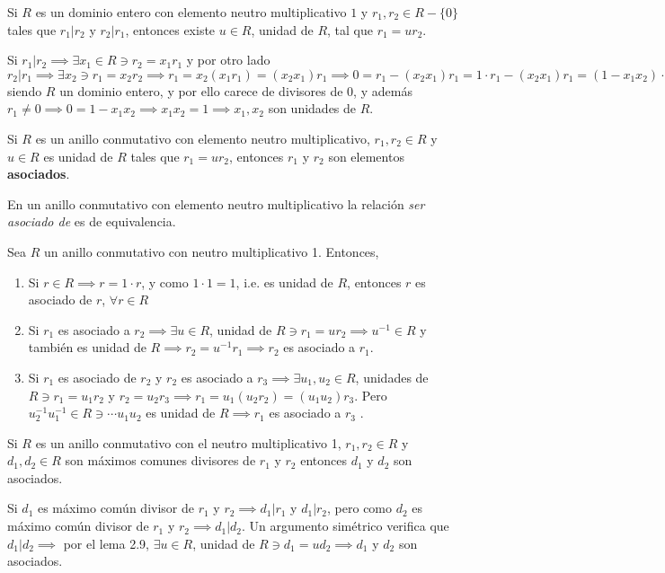 \begin{lema}[3.9]
    Si $R$ es un dominio entero con elemento neutro multiplicativo $1$ y $r_1,r_2\in R-\{0\}$ tales que $r_1|r_2$ y $r_2|r_1$, entonces existe $u\in R$, unidad de $R$, tal que $r_1=ur_2$.
    \begin{dem}
        Si $r_1|r_2\implies \exists x_1\in R\ni r_2=x_1r_1$ y por otro lado $r_2|r_1\implies \exists x_2\ni r_1=x_2r_2\implies r_1=x_2(x_1r_1)=(x_2x_1)r_1\implies 0=r_1-(x_2x_1)r_1 = 1\cdot r_1-(x_2x_1)r_1= (1-x_1x_2)\cdot r_1 \implies$ siendo $R$ un dominio entero, y por ello carece de divisores de 0, y además $r_1\neq 0\implies 0=1-x_1x_2\implies x_1x_2=1\implies x_1,x_2$ son unidades de $R$. 
    \end{dem} 
\end{lema}


\begin{definicion}
    Si $R$ es un anillo conmutativo con elemento neutro multiplicativo, $r_1,r_2\in R$ y $u\in R$ es unidad de $R$ tales que $r_1=ur_2$, entonces $r_1$ y $r_2$ son elementos \textbf{asociados}.
\end{definicion}

\begin{prop}
    En un anillo conmutativo con elemento neutro multiplicativo la relación \textit{ser asociado de} es de equivalencia. 
    \begin{dem}
        Sea $R$ un anillo conmutativo con neutro multiplicativo 1. Entonces, 
        \begin{enumerate}
            \item Si $r\in R\implies r=1\cdot r$, y como $1\cdot 1 =1$, i.e. es unidad de $R$, entonces $r$ es asociado de $r$, $\forall r\in R$
            \item Si $r_1$ es asociado a $r_2\implies\exists u\in R$, unidad de $R\ni r_1=ur_2\implies u^{-1}\in R$ y también es unidad de $R\implies r_2=u^{-1}r_1\implies r_2$ es asociado a $r_1$. 
            \item Si $r_1$ es asociado de $r_2$ y $r_2$ es asociado a $r_3\implies\exists u_1,u_2\in R$, unidades de $R\ni r_1=u_1r_2$ y $r_2=u_2r_3\implies r_1=u_1(u_2r_2)=(u_1u_2)r_3$. Pero $u_2^{-1}u_1^{-1}\in R\ni \cdots u_1u_2$ es unidad de $R\implies r_1$ es asociado a $r_3$ .  
        \end{enumerate}
    \end{dem}
\end{prop}

\begin{prop}
    Si $R$ es un anillo conmutativo con el neutro multiplicativo 1, $r_1,r_2\in R$ y $d_1,d_2\in R$ son máximos comunes divisores de $r_1$ y $r_2$ entonces $d_1$ y $d_2$ son asociados. 
    \begin{dem}
        Si $d_1$ es máximo común divisor de $r_1$ y $r_2\implies d_1|r_1$ y $d_1|r_2$, pero como $d_2$ es máximo común divisor de $r_1$ y $r_2\implies d_1|d_2$. Un argumento simétrico verifica que $d_1|d_2\implies$ por el lema 2.9, $\exists u\in R$, unidad de $R\ni d_1=ud_2\implies d_1$ y $d_2$ son asociados. 
    \end{dem}
\end{prop}

